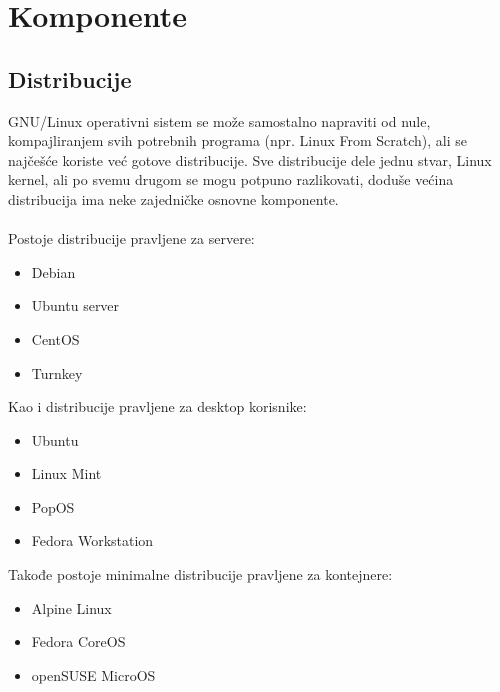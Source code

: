 \documentclass[a4paper,14pt]{article}
\begin{document}
\begin{figure}[h]
	\centering
    \hspace{1cm}
\end{figure}
\newpage

\section{Komponente}
\subsection{Distribucije}
GNU/Linux operativni sistem se može samostalno napraviti od nule, kompajliranjem svih potrebnih programa (npr. Linux From Scratch), ali se najčešće koriste već gotove distribucije. Sve distribucije dele jednu stvar, Linux kernel, ali po svemu drugom se mogu potpuno razlikovati, doduše većina distribucija ima neke zajedničke osnovne komponente.
\\\\
Postoje distribucije pravljene za servere:
\begin{itemize}
\item Debian
\item Ubuntu server
\item CentOS
\item Turnkey
\end{itemize}
Kao i distribucije pravljene za desktop korisnike:
\begin{itemize}
\item Ubuntu
\item Linux Mint
\item PopOS
\item Fedora Workstation
\end{itemize}
Takođe postoje minimalne distribucije pravljene za kontejnere:
\begin{itemize}
\item Alpine Linux
\item Fedora CoreOS
\item openSUSE MicroOS
\end{itemize}
\newpage
\end{document}
